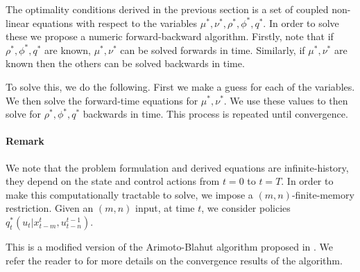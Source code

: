 The optimality conditions derived in the previous section is a set of coupled non-linear equations with respect to the variables $\mu^{*},\nu^*,\rho^*,\phi^*,q^*$. In order to solve these we propose a numeric forward-backward algorithm. Firstly, note that if $\rho^*,\phi^*,q^*$ are known, $\mu^{*},\nu^*$ can be solved forwards in time. Similarly, if $\mu^{*},\nu^*$ are known then the others can be solved backwards in time. 

To solve this, we do the following. First we make a guess for each of the variables. We then solve the forward-time equations for $\mu^{*},\nu^*$. We use these values to then solve for $\rho^*,\phi^*,q^*$ backwards in time. This process is repeated until convergence. 

\paragraph*{Remark} We note that the problem formulation and derived equations are infinite-history, \ie they depend on the state and control actions from $t=0$ to $t=T$. In order to make this computationally tractable to solve, we impose a $(m,n)$-finite-memory restriction. Given an $(m,n)$ input, at time $t$, we consider policies $q_t^*(u_t|x^t_{t-m},u^{t-1}_{t-n})$. 

This is a modified version of the Arimoto-Blahut algorithm proposed in \cite{Naiss13}. We refer the reader to \cite{takashi17} for more details on the convergence results of the algorithm. 

